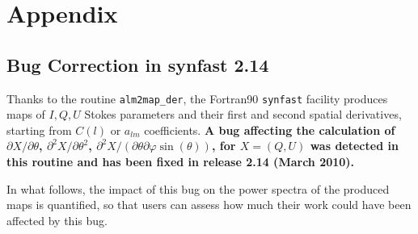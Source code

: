 \section[Appendix]{Appendix}
\label{appendix}
\subsection{Bug Correction in synfast 2.14}
\label{sec:bug_synder}
Thanks to the routine {\tt alm2map\_der}, the Fortran90 {\tt synfast} facility  produces
maps of $I,Q,U$ Stokes parameters and their first and second spatial derivatives,
starting from $C(l)$ or $a_{lm}$ coefficients.
{\bf A bug affecting the calculation of $\partial X/\partial\theta$, 
$\partial^2 X/\partial \theta^2$, 
$\partial^2 X/(\partial\theta\partial\varphi\sin(\theta))$, for $X=(Q,U)$
was detected in this routine and has been fixed in release 2.14 (March 2010).}

In what follows, the impact of this bug on the power spectra of
the produced maps is quantified, so that users can
assess how much their work could have been affected by this bug.

